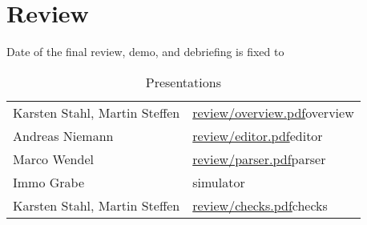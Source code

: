 
\section*{Review}

Date of the final review, demo, and debriefing is fixed to

\begin{center}
\end{center}



\begin{table}[htbp]
  \centering
  \begin{tabular}{ll}
    Karsten Stahl, Martin Steffen & \url{review/overview.pdf}{overview}
    \\
    Andreas Niemann & \url{review/editor.pdf}{editor}
    \\
    Marco Wendel & \url{review/parser.pdf}{parser}
    \\
    Immo Grabe & simulator
    \\
    Karsten Stahl, Martin Steffen & \url{review/checks.pdf}{checks}
  \end{tabular}
  \caption{Presentations}
  \label{tab:presentations}
\end{table}



